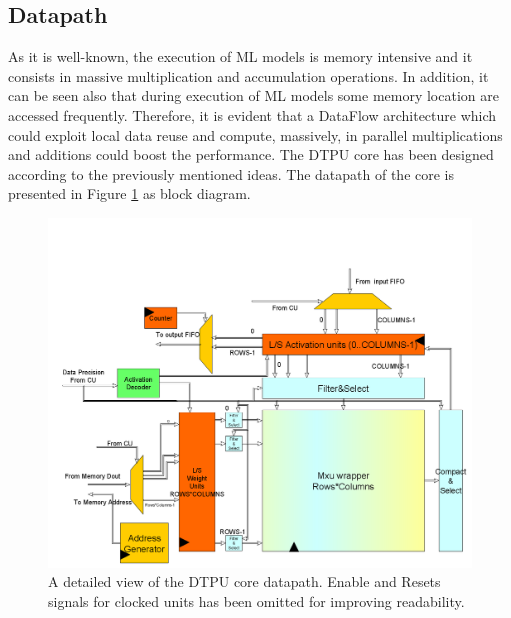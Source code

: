 \subsection{Datapath}
As it is well-known, the execution of ML models is memory intensive and it consists in massive multiplication and accumulation operations. In addition, it can be seen also that during execution of ML models some memory location are accessed frequently. Therefore, it is evident that a DataFlow architecture which could exploit local data reuse and compute, massively, in parallel multiplications and additions could boost the performance.
The DTPU core has been designed according to the previously mentioned ideas.
The datapath of the core is presented in Figure \ref{fig:datapath} as block diagram.
\begin{figure}[H]
\centering
\captionsetup{justification=centering}
\includegraphics[scale=0.3,angle=0]{./figure/datapath_dtpu_core.png}
\caption{A detailed view of the DTPU core datapath. Enable and Resets signals for clocked units has been omitted for improving readability. }
\label{fig:datapath}
\end{figure} 

